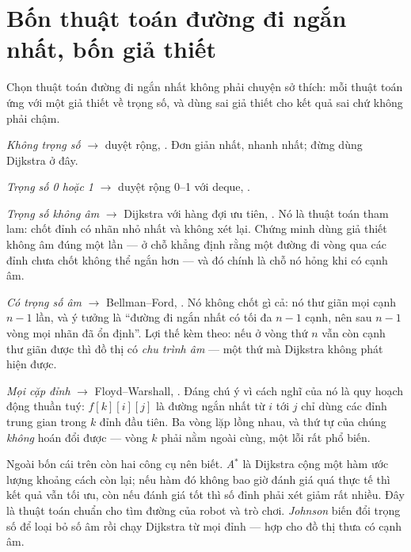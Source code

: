 \documentclass[../../algorithm.tex]{subfiles}
\begin{document}
\section{Bốn thuật toán đường đi ngắn nhất, bốn giả thiết}

Chọn thuật toán đường đi ngắn nhất không phải chuyện sở thích: mỗi thuật toán ứng với một giả thiết về trọng số, và dùng sai giả thiết cho kết quả sai chứ không phải chậm.

\emph{Không trọng số} \(\rightarrow\) duyệt rộng, . Đơn giản nhất, nhanh nhất; đừng dùng Dijkstra ở đây.

\emph{Trọng số 0 hoặc 1} \(\rightarrow\) duyệt rộng 0--1 với deque, .

\emph{Trọng số không âm} \(\rightarrow\) Dijkstra với hàng đợi ưu tiên, . Nó là thuật toán tham lam: chốt đỉnh có nhãn nhỏ nhất và không xét lại. Chứng minh dùng giả thiết không âm đúng một lần --- ở chỗ khẳng định rằng một đường đi vòng qua các đỉnh chưa chốt không thể ngắn hơn --- và đó chính là chỗ nó hỏng khi có cạnh âm.

\emph{Có trọng số âm} \(\rightarrow\) Bellman--Ford, . Nó không chốt gì cả: nó thư giãn mọi cạnh \(n-1\) lần, và ý tưởng là ``đường đi ngắn nhất có tối đa \(n-1\) cạnh, nên sau \(n-1\) vòng mọi nhãn đã ổn định''. Lợi thế kèm theo: nếu ở vòng thứ \(n\) vẫn còn cạnh thư giãn được thì đồ thị có \emph{chu trình âm} --- một thứ mà Dijkstra không phát hiện được.

\emph{Mọi cặp đỉnh} \(\rightarrow\) Floyd--Warshall, . Đáng chú ý vì cách nghĩ của nó là quy hoạch động thuần tuý: \(f[k][i][j]\) là đường ngắn nhất từ \(i\) tới \(j\) chỉ dùng các đỉnh trung gian trong \(k\) đỉnh đầu tiên. Ba vòng lặp lồng nhau, và thứ tự của chúng \emph{không} hoán đổi được --- vòng \(k\) phải nằm ngoài cùng, một lỗi rất phổ biến.

Ngoài bốn cái trên còn hai công cụ nên biết. \emph{A\(^\ast\)} là Dijkstra cộng một hàm ước lượng khoảng cách còn lại; nếu hàm đó không bao giờ đánh giá quá thực tế thì kết quả vẫn tối ưu, còn nếu đánh giá tốt thì số đỉnh phải xét giảm rất nhiều. Đây là thuật toán chuẩn cho tìm đường của robot và trò chơi. \emph{Johnson} biến đổi trọng số để loại bỏ số âm rồi chạy Dijkstra từ mọi đỉnh --- hợp cho đồ thị thưa có cạnh âm.
\end{document}
